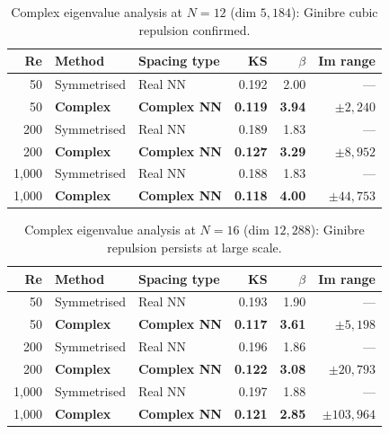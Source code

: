 \documentclass[11pt,a4paper]{article}
\theoremstyle{plain}
\theoremstyle{definition}
\theoremstyle{remark}
\begin{document}
\begin{table}[H]
\centering
\caption{Complex eigenvalue analysis at $N = 12$ (dim $5{,}184$): Ginibre cubic repulsion confirmed.}
\begin{tabular}{rllrrr}
\toprule
Re & Method & Spacing type & KS & $\beta$ & Im range \\
\midrule
50 & Symmetrised & Real NN & 0.192 & 2.00 & --- \\
50 & \textbf{Complex} & \textbf{Complex NN} & \textbf{0.119} & \textbf{3.94} & $\pm 2{,}240$ \\
\midrule
200 & Symmetrised & Real NN & 0.189 & 1.83 & --- \\
200 & \textbf{Complex} & \textbf{Complex NN} & \textbf{0.127} & \textbf{3.29} & $\pm 8{,}952$ \\
\midrule
1{,}000 & Symmetrised & Real NN & 0.188 & 1.83 & --- \\
1{,}000 & \textbf{Complex} & \textbf{Complex NN} & \textbf{0.118} & \textbf{4.00} & $\pm 44{,}753$ \\
\bottomrule
\end{tabular}
\end{table}

\begin{table}[H]
\centering
\caption{Complex eigenvalue analysis at $N = 16$ (dim $12{,}288$): Ginibre repulsion persists at large scale.}
\begin{tabular}{rllrrr}
\toprule
Re & Method & Spacing type & KS & $\beta$ & Im range \\
\midrule
50 & Symmetrised & Real NN & 0.193 & 1.90 & --- \\
50 & \textbf{Complex} & \textbf{Complex NN} & \textbf{0.117} & \textbf{3.61} & $\pm 5{,}198$ \\
\midrule
200 & Symmetrised & Real NN & 0.196 & 1.86 & --- \\
200 & \textbf{Complex} & \textbf{Complex NN} & \textbf{0.122} & \textbf{3.08} & $\pm 20{,}793$ \\
\midrule
1{,}000 & Symmetrised & Real NN & 0.197 & 1.88 & --- \\
1{,}000 & \textbf{Complex} & \textbf{Complex NN} & \textbf{0.121} & \textbf{2.85} & $\pm 103{,}964$ \\
\bottomrule
\end{tabular}
\end{table}
\end{document}
